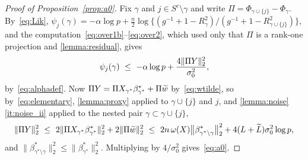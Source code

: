 \begin{proof}[Proof of Proposition~\ref{prop:a0}]
    Fix $\gamma$ and $j\in S^{c}\setminus\gamma$ and write
    $\Pi=\Phi_{\gamma\cup\{j\}}-\Phi_\gamma$. By~\eqref{eq:Lik},
    $\psi_j(\gamma)=-\alpha\log p+\tfrac n2\log\{(g^{-1}
    +1-R^{2}_{\gamma})/(g^{-1}+1-R^{2}_{\gamma\cup\{j\}})\}$, and the
    computation~\eqref{eq:over1b}--\eqref{eq:over2}, which used only that
    $\Pi$ is a rank-one projection and \cref{lemma:residual}, gives
    \begin{equation*}
        \psi_j(\gamma)\ \leq\ -\alpha\log p
        +\frac{4\lVert\Pi Y\rVert_2^{2}}{\sigma_0^{2}} ,
    \end{equation*}
    by~\eqref{eq:alphadef}. Now
    $\Pi Y=\Pi X_{\gamma^{\ast}}\beta^{\ast}_{\gamma^{\ast}}+\Pi\widetilde w$ by~\eqref{eq:wtilde}, so
    by~\eqref{eq:elementary}, \cref{lemma:proxy} applied to
    $\gamma\cup\{j\}$ and $j$, and
    \cref{lemma:noise}\ref{it:noise_ii} applied to the nested pair
    $\gamma\subset\gamma\cup\{j\}$,
    \begin{equation*}
        \lVert\Pi Y\rVert_2^{2}
        \ \leq\ 2\lVert\Pi X_{\gamma^{\ast}}\beta^{\ast}_{\gamma^{\ast}}\rVert_2^{2}+2\lVert\Pi\widetilde w\rVert_2^{2}
        \ \leq\ 2n\,\omega(X)
        \bigl\|\beta^{\ast}_{\gamma^{\ast}\setminus\gamma}\bigr\|_2^{2}
        +4(L+\widetilde{L})\sigma_0^{2}\log p ,
    \end{equation*}
    and $\|\beta^{\ast}_{\gamma^{\ast}\setminus\gamma}\|_2^{2}
    \leq\|\beta^{\ast}_{\gamma^{\ast}}\|_2^{2}$. Multiplying by
    $4/\sigma_0^{2}$ gives~\eqref{eq:a0}.
\end{proof}
